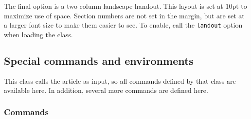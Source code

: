 \documentclass[11pt, tipa, color]{./lingdoc}
\newcommand{\Option}[1]{\texttt{#1}}
\newcommand{\Package}[1]{\textsf{{#1}}}
\begin{document}
    The final option is a two-column landscape handout. This layout is set at 10pt to maximize use of space. Section numbers are not set in the margin, but are set at a larger font size to make them easier to see. To enable, call the \Option{landout} option when loading the class.
  
  \subsection{Special commands and environments}
  
    This class calls the \Package{article} as input, so all commands defined by that class are available here. In addition, several more commands are defined here.
    
  \subsubsection{Commands}
        
\end{document}
